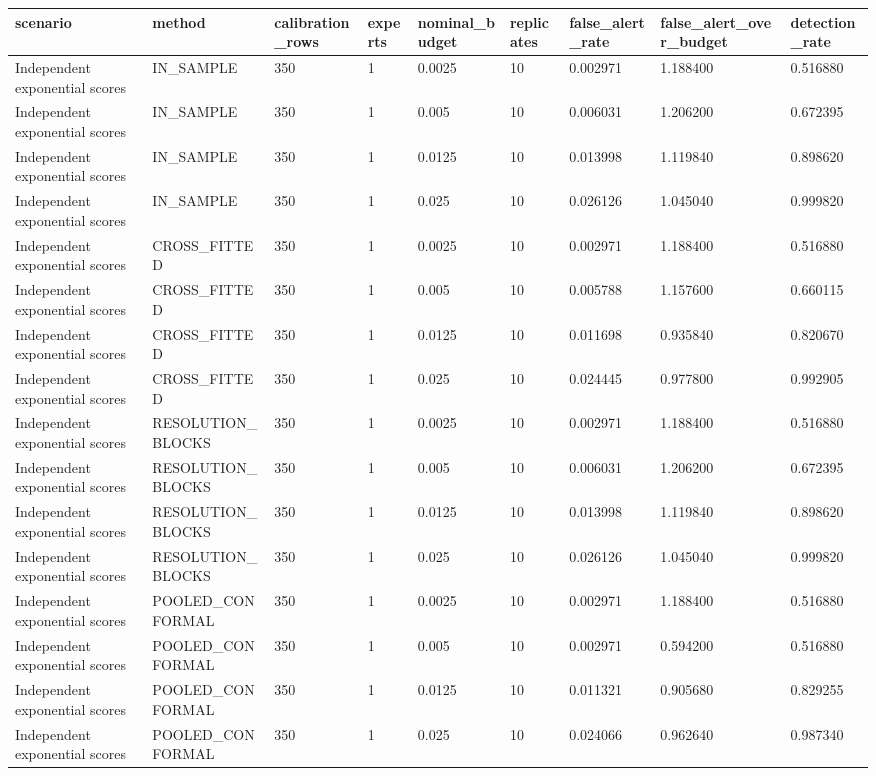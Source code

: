 \begin{tabular}{lllllllll}
\toprule
scenario & method & calibration\_rows & experts & nominal\_budget & replicates & false\_alert\_rate & false\_alert\_over\_budget & detection\_rate \\
\midrule
Independent exponential scores & IN\_SAMPLE & 350 & 1 & 0.0025 & 10 & 0.002971 & 1.188400 & 0.516880 \\
Independent exponential scores & IN\_SAMPLE & 350 & 1 & 0.005 & 10 & 0.006031 & 1.206200 & 0.672395 \\
Independent exponential scores & IN\_SAMPLE & 350 & 1 & 0.0125 & 10 & 0.013998 & 1.119840 & 0.898620 \\
Independent exponential scores & IN\_SAMPLE & 350 & 1 & 0.025 & 10 & 0.026126 & 1.045040 & 0.999820 \\
Independent exponential scores & CROSS\_FITTED & 350 & 1 & 0.0025 & 10 & 0.002971 & 1.188400 & 0.516880 \\
Independent exponential scores & CROSS\_FITTED & 350 & 1 & 0.005 & 10 & 0.005788 & 1.157600 & 0.660115 \\
Independent exponential scores & CROSS\_FITTED & 350 & 1 & 0.0125 & 10 & 0.011698 & 0.935840 & 0.820670 \\
Independent exponential scores & CROSS\_FITTED & 350 & 1 & 0.025 & 10 & 0.024445 & 0.977800 & 0.992905 \\
Independent exponential scores & RESOLUTION\_BLOCKS & 350 & 1 & 0.0025 & 10 & 0.002971 & 1.188400 & 0.516880 \\
Independent exponential scores & RESOLUTION\_BLOCKS & 350 & 1 & 0.005 & 10 & 0.006031 & 1.206200 & 0.672395 \\
Independent exponential scores & RESOLUTION\_BLOCKS & 350 & 1 & 0.0125 & 10 & 0.013998 & 1.119840 & 0.898620 \\
Independent exponential scores & RESOLUTION\_BLOCKS & 350 & 1 & 0.025 & 10 & 0.026126 & 1.045040 & 0.999820 \\
Independent exponential scores & POOLED\_CONFORMAL & 350 & 1 & 0.0025 & 10 & 0.002971 & 1.188400 & 0.516880 \\
Independent exponential scores & POOLED\_CONFORMAL & 350 & 1 & 0.005 & 10 & 0.002971 & 0.594200 & 0.516880 \\
Independent exponential scores & POOLED\_CONFORMAL & 350 & 1 & 0.0125 & 10 & 0.011321 & 0.905680 & 0.829255 \\
Independent exponential scores & POOLED\_CONFORMAL & 350 & 1 & 0.025 & 10 & 0.024066 & 0.962640 & 0.987340 \\

\end{tabular}
